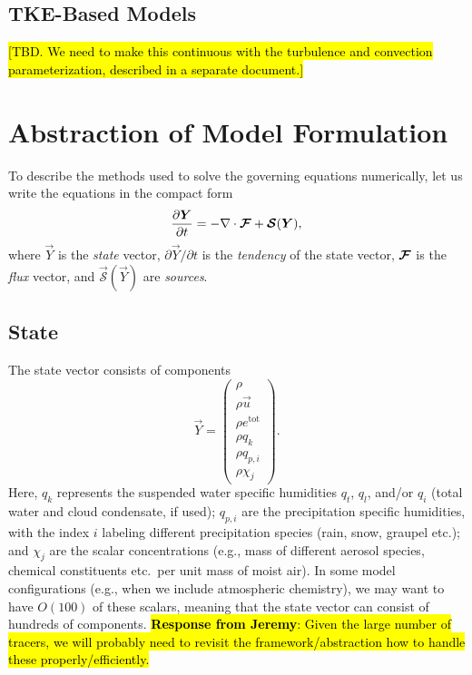 \documentclass{article}
\begin{document}
\citep{Abkar17a}

\subsection{TKE-Based Models}

\citep{Deardorff80a}

\hl{[TBD. We need to make this continuous with the turbulence and convection parameterization, described in a separate document.]}

\section{Abstraction of Model Formulation}\label{s:abstract_model_formulation}

To describe the methods used to solve the governing equations numerically, let us write the equations in the compact form 
\begin{equation}\label{e:eom_compact}
\frac{\partial \boldsymbol{{Y}}}{\partial t}  =  - \nabla \cdot \boldsymbol{{\mathcal{F}}} + \boldsymbol{{\mathcal{S}}}(\boldsymbol{{Y}}),
\end{equation}
where $\vec{Y}$ is the \emph{state} vector, $\partial\vec{Y}/\partial t$ is the \emph{tendency} of the state vector, $\boldsymbol{{\mathcal{F}}}$ is the \emph{flux} vector, and $\vec{\mathcal{S}}(\vec{Y})$ are \emph{sources}. 

\subsection{State}

The state vector consists of components
\begin{equation}\label{e:state}
\vec{Y}=\left( \begin{array}{c}
\rho \\
\rho\vec{u} \\
\rho e^{\mathrm{tot}}\\
\rho q_k\\
\rho q_{p,i}\\
\rho \chi_j
\end{array}
\right).
\end{equation}
Here, $q_k$ represents the suspended water specific humidities $q_t$, $q_l$, and/or $q_i$ (total water and cloud condensate, if used); $q_{p,i}$ are the precipitation specific humidities, with the index $i$ labeling different precipitation species (rain, snow, graupel etc.); and $\chi_j$ are the scalar concentrations (e.g., mass of different aerosol species, chemical constituents etc.\ per unit mass of moist air). In some model configurations (e.g., when we include atmospheric chemistry), we may want to have $O(100)$ of these scalars, meaning that the state vector can consist of hundreds of components. \hl{\textbf{Response from Jeremy}:
Given the large number of tracers, we will probably need to revisit the framework/abstraction how to handle these properly/efficiently.}
\end{document}

